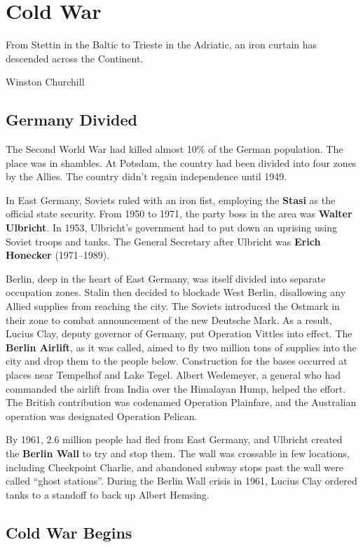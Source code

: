 \chapter{Cold War}

\epigraph{%
  From Stettin in the Baltic to Trieste in the Adriatic, an iron curtain has descended across the Continent.
}{Winston Churchill}

\section{Germany Divided}

The Second World War had killed almost 10\% of the German population.
The place was in shambles.
At Potsdam, the country had been divided into four zones by the Allies.
The country didn't regain independence until 1949.

In East Germany, Soviets ruled with an iron fist,
employing the \textbf{Stasi} as the official state security.
From 1950 to 1971, the party boss in the area was \textbf{Walter Ulbricht}.
In 1953, Ulbricht's government had to put down an uprising using Soviet troops and tanks.
The General Secretary after Ulbricht was \textbf{Erich Honecker} (1971--1989).

Berlin, deep in the heart of East Germany, was itself divided into separate occupation zones.
Stalin then decided to blockade West Berlin, disallowing any Allied supplies from reaching the city.
The Soviets introduced the Ostmark in their zone to combat announcement of the new Deutsche Mark.
As a result, Lucius Clay, deputy governor of Germany, put Operation Vittles into effect.
The \textbf{Berlin Airlift}, as it was called,
aimed to fly two million tons of supplies into the city and drop them to the people below.
Construction for the bases occurred at places near Tempelhof and Lake Tegel.
Albert Wedemeyer, a general who had commanded the airlift from India over the Himalayan Hump,
helped the effort.
The British contribution was codenamed Operation Plainfare,
and the Australian operation was designated Operation Pelican.

By 1961, 2.6 million people had fled from East Germany,
and Ulbricht created the \textbf{Berlin Wall} to try and stop them.
The wall was crossable in few locations, including Checkpoint Charlie,
and abandoned subway stops past the wall were called ``ghost stations''.
During the Berlin Wall crisis in 1961,
Lucius Clay ordered tanks to a standoff to back up Albert Hemsing.

\section{Cold War Begins}

